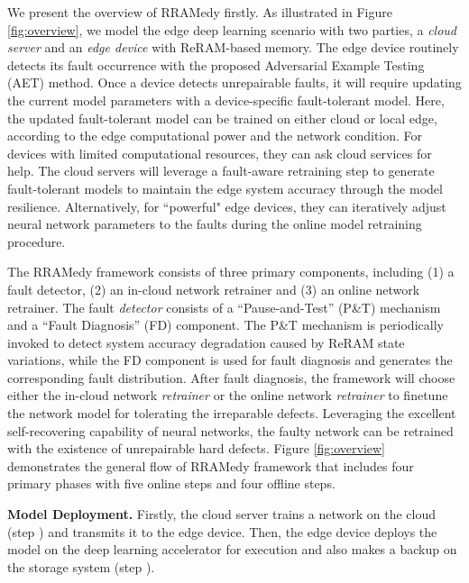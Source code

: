 We present the overview of RRAMedy firstly. As illustrated in Figure \ref{fig:overview}, we model the edge deep learning scenario with two parties, a \emph{cloud server}  and an \emph{edge device} with ReRAM-based memory. The edge device routinely detects its fault occurrence with the proposed Adversarial Example Testing (AET) method. Once a device detects unrepairable faults, it will require updating the current model parameters with a device-specific fault-tolerant model. Here, the updated fault-tolerant model can be trained on either cloud or local edge, according to the edge computational power and the network condition. For devices with limited computational resources, they can ask cloud services for help. The cloud servers will leverage a fault-aware retraining step to generate  fault-tolerant models to maintain the edge system accuracy through the model resilience. Alternatively, for ``powerful" edge devices, they can iteratively adjust neural network parameters to the faults during the online model retraining procedure. 
                                                                            
The RRAMedy framework consists of three primary components, including (1) a fault detector, (2) an in-cloud network retrainer and (3) an online network retrainer. The fault \emph{detector} consists of a ``Pause-and-Test'' (P\&T) mechanism and a ``Fault Diagnosis'' (FD) component.  The P\&T mechanism is periodically invoked to detect system accuracy degradation caused by ReRAM state variations, while the FD component is used for fault diagnosis and generates the corresponding fault distribution. After fault diagnosis,  the framework will choose either the in-cloud network \emph{retrainer} or the online network \emph{retrainer} to finetune the network model for tolerating the irreparable defects. Leveraging the excellent self-recovering capability of neural networks, the faulty network can be retrained with the existence  of unrepairable hard defects. Figure \ref{fig:overview} demonstrates the general flow of RRAMedy framework that includes four primary phases with five online steps and four offline steps.                                                                                            
                                                                                                
\textbf{Model Deployment.} Firstly, the cloud server trains a network on the cloud (step ) and transmits it to the edge device. Then, the edge device deploys the model on the deep learning accelerator for execution and also makes a backup on the storage system (step ).
                                                                                                        
